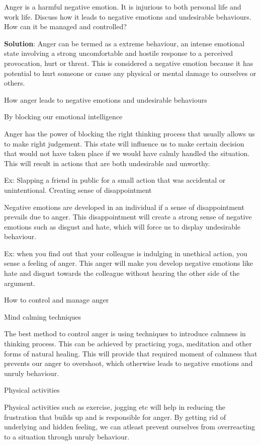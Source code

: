 \documentclass[
  openany]{book}
\newcommand{\question}{\item}
\newenvironment{solution}{ {\bfseries Solution}:}{}
\begin{document}
\begin{questions}
\question Anger is a harmful negative emotion. It is injurious to both personal life and work life. Discuss how it leads to negative emotions and undesirable behaviours. How can it be managed and controlled?

\begin{solution}
Anger can be termed as a extreme behaviour, an intense emotional state involving a strong uncomfortable and hostile response to a perceived provocation, hurt or threat. This is considered a negative emotion because it has potential to hurt someone or cause any physical or mental damage to ourselves or others.

How anger leads to negative emotions and undesirable behaviours

By blocking our emotional intelligence

Anger has the power of blocking the right thinking process that usually allows us to make right judgement. This state will influence us to make certain decision that would not have taken place if we would have calmly handled the situation. This will result in actions that are both undesirable and unworthy.

Ex: Slapping a friend in public for a small action that was accidental or unintentional.
    Creating sense of disappointment

Negative emotions are developed in an individual if a sense of disappointment prevails due to anger. This disappointment will create a strong sense of negative emotions such as disgust and hate, which will force us to display undesirable behaviour.

Ex: when you find out that your colleague is indulging in unethical action, you sense a feeling of anger. This anger will make you develop negative emotions like hate and disgust towards the colleague without hearing the other side of the argument.

How to control and manage anger

Mind calming techniques

The best method to control anger is using techniques to introduce calmness in thinking process. This can be achieved by practicing yoga, meditation and other forms of natural healing. This will provide that required moment of calmness that prevents our anger to overshoot, which otherwise leads to negative emotions and unruly behaviour.

Physical activities

Physical activities such as exercise, jogging etc will help in reducing the frustration that builds up and is responsible for anger. By getting rid of underlying and hidden feeling, we can atleast prevent ourselves from overreacting to a situation through unruly behaviour.


\end{solution}
\end{questions}
\end{document}
